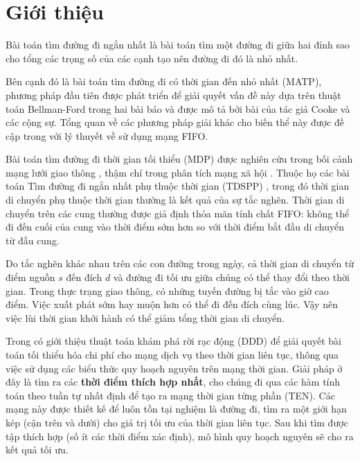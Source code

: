 \documentclass[../main.tex]{subfiles}
\begin{document}
\chapter*{Giới thiệu}\label{introduce}

Bài toán tìm đường đi ngắn nhất là bài toán tìm một đường đi giữa hai đỉnh sao cho tổng các trọng số của các cạnh tạo nên đường đi đó là nhỏ nhất.

Bên cạnh đó là bài toán tìm đường đi có thời gian đến nhỏ nhất (MATP), phương pháp đầu
tiên được phát triển để giải quyết vấn đề này dựa trên thuật toán
Bellman-Ford trong hai bài báo \cite{bellman1958routing,ford2010flows} và được mô tả bởi
bài \cite{cooke1966shortest} của tác giả Cooke và các cộng sự. Tổng quan về các phương pháp giải khác cho biến thể
này được đề cập trong \cite{dean2004shortest} với lý thuyết về sử dụng mạng FIFO.

Bài toán tìm đường đi thời gian tối thiểu (MDP) được nghiên cứu trong bối cảnh mạng lưới giao thông \cite{demiryurek2011online}, thậm chí trong phân tích mạng xã hội \cite{gunturi2012information}.
Thuộc họ các bài toán Tìm đường đi ngắn nhất phụ thuộc thời gian (TDSPP) \cite{he2018dynamic}, 
trong đó thời gian di chuyển phụ thuộc thời gian thường là kết quả của sự tắc nghẽn. Thời gian di chuyển trên các cung 
thường được giả định thỏa mãn tính chất FIFO: không thể đi đến cuối của cung vào thời điểm sớm hơn so với thời điểm bắt đầu di chuyển từ đầu cung.

Do tắc nghẽn khác nhau trên các con đường trong ngày, cả thời gian di chuyển từ điểm nguồn \(s\) đến đích \(d\) và đường đi tối ưu giữa chúng có thể thay đổi theo thời gian.
Trong thực trạng giao thông, có những tuyến đường bị tắc vào giờ cao điểm. Việc xuất phát sớm hay muộn hơn có thể đi đến đích cùng lúc. 
Vậy nên việc lùi thời gian khởi hành có thể giảm tổng thời gian di chuyển.

Trong \cite{boland2017continuous} có giới thiệu thuật toán khám phá rời rạc động (DDD) để giải quyết bài
toán tối thiểu hóa chi phí cho mạng dịch vụ theo thời gian liên tục,
thông qua việc sử dụng các biểu thức quy hoạch nguyên trên mạng thời
gian. Giải pháp ở đây là tìm ra các \textbf{thời điểm thích hợp nhất},
cho chúng đi qua các hàm tính toán theo tuần tự nhất định để tạo ra mạng
thời gian từng phần (TEN). Các mạng này được thiết kế để luôn tồn tại nghiệm là đường đi, tìm
ra một giới hạn kép (cận trên và dưới) cho giá trị tối ưu của thời gian
liên tục. Sau khi tìm được tập thích hợp (số ít các thời điểm xác định), mô hình
quy hoạch nguyên sẽ cho ra kết quả tối ưu.
\end{document}
